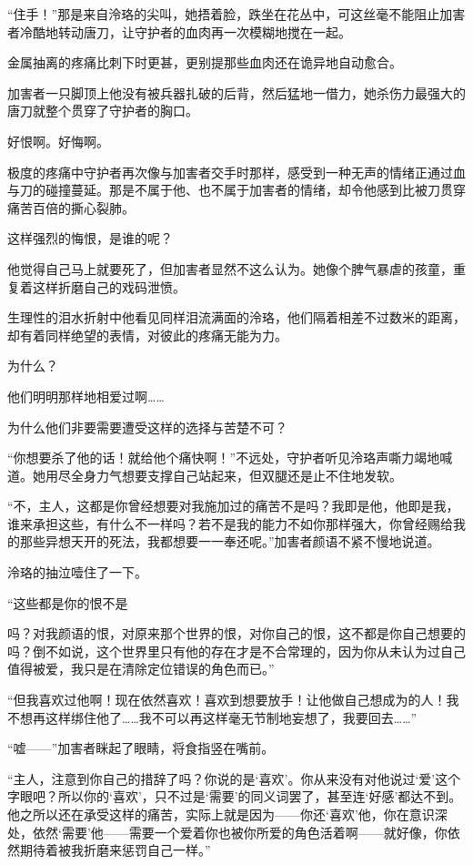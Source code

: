 \documentclass[UTF8, scheme = chinese, openany]{ctexbook}
\begin{document}
“住手！”那是来自泠珞的尖叫，她捂着脸，跌坐在花丛中，可这丝毫不能阻止加害者冷酷地转动唐刀，让守护者的血肉再一次模糊地搅在一起。

金属抽离的疼痛比刺下时更甚，更别提那些血肉还在诡异地自动愈合。

加害者一只脚顶上他没有被兵器扎破的后背，然后猛地一借力，她杀伤力最强大的唐刀就整个贯穿了守护者的胸口。

好恨啊。好悔啊。

极度的疼痛中守护者再次像与加害者交手时那样，感受到一种无声的情绪正通过血与刀的碰撞蔓延。那是不属于他、也不属于加害者的情绪，却令他感到比被刀贯穿痛苦百倍的撕心裂肺。

这样强烈的悔恨，是谁的呢？

他觉得自己马上就要死了，但加害者显然不这么认为。她像个脾气暴虐的孩童，重复着这样折磨自己的戏码泄愤。

生理性的泪水折射中他看见同样泪流满面的泠珞，他们隔着相差不过数米的距离，却有着同样绝望的表情，对彼此的疼痛无能为力。

为什么？

他们明明那样地相爱过啊……

为什么他们非要需要遭受这样的选择与苦楚不可？

“你想要杀了他的话！就给他个痛快啊！”不远处，守护者听见泠珞声嘶力竭地喊道。她用尽全身力气想要支撑自己站起来，但双腿还是止不住地发软。

“不，主人，这都是你曾经想要对我施加过的痛苦不是吗？我即是他，他即是我，谁来承担这些，有什么不一样吗？若不是我的能力不如你那样强大，你曾经赐给我的那些异想天开的死法，我都想要一一奉还呢。”加害者颜语不紧不慢地说道。

泠珞的抽泣噎住了一下。

“这些都是你的恨不是

吗？对我颜语的恨，对原来那个世界的恨，对你自己的恨，这不都是你自己想要的吗？倒不如说，这个世界里只有他的存在才是不合常理的，因为你从未认为过自己值得被爱，我只是在清除定位错误的角色而已。”

“但我喜欢过他啊！现在依然喜欢！喜欢到想要放手！让他做自己想成为的人！我不想再这样绑住他了……我不可以再这样毫无节制地妄想了，我要回去……”

“嘘——”加害者眯起了眼睛，将食指竖在嘴前。

“主人，注意到你自己的措辞了吗？你说的是‘喜欢’。你从来没有对他说过‘爱’这个字眼吧？所以你的‘喜欢’，只不过是‘需要’的同义词罢了，甚至连‘好感’都达不到。他之所以还在承受这样的痛苦，实际上就是因为——你还‘喜欢’他，你在意识深处，依然‘需要’他——需要一个爱着你也被你所爱的角色活着啊——就好像，你依然期待着被我折磨来惩罚自己一样。”
\end{document}
